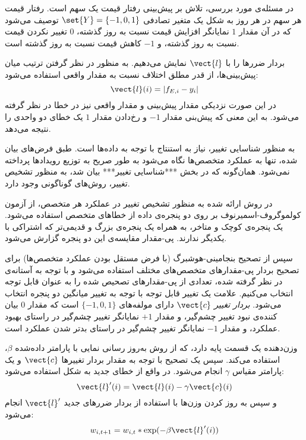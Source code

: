 \documentclass[a4paper,11px]{article}
\begin{document}

در مسئله‌ی مورد بررسی، تلاش بر پیش‌بینی رفتار قیمت یک سهم است. رفتار قیمت هر سهم در هر روز به شکل یک متغیر تصادفی 
$\set{Y} = \{ -1, 0, 1 \}$ 
توصیف می‌شود که در آن مقدار 
$1$ 
نمایانگر افزایش قیمت نسبت به روز گذشته، 
$0$ 
تغییر نکردن قیمت نسبت به روز گذشته، و 
$-1$ 
کاهش قیمت نسبت به روز گذشته است.

بردار ضررها را با 
$\vect{l}$ 
نمایش می‌دهیم. به منظور در نظر گرفتن ترتیب میان پیش‌بینی‌ها، از قدر مطلق اختلاف نسبت به مقدار واقعی استفاده می‌شود:
\[
\vect{l}(i) = | f_{E,i} - y_i |
\]
در این صورت نزدیکی مقدار پیش‌بینی و مقدار واقعی نیز در خطا در نظر گرفته می‌شود. به این معنی که پیش‌بنی مقدار 
$-1$ 
و رخ‌دادن مقدار 
$1$ 
یک خطای دو واحدی را نتیجه می‌دهد.



به منظور شناسایی تغییر، نیاز به استنتاج با توجه به داده‌ها است. طبق فرض‌های بیان شده، تنها به عملکرد متخصص‌ها نگاه می‌شود به طور صریح به توزیع رویدادها پرداخته نمی‌شود. همان‌گونه که در بخش ***شناسایی تغییر*** بیان شد، به منظور تشخیص تغییر، روش‌های گوناگونی وجود دارد.

در روش ارائه شده به منظور تشخیص تغییر در عملکرد هر متخصص، از آزمون کولموگروف-اسمیرنوف
بر روی دو پنجره‌ی داده از خطاهای متخصص استفاده می‌شود. یک پنجره‌ی کوچک و متاخر، به همراه یک پنجره‌ی بزرگ و قدیمی‌تر که اشتراکی با یکدیگر ندارند. پی-مقدار
مقایسه‌ی این دو پنجره گزارش می‌شود.


سپس از تصحیح بنجامینی-هوشبرگ
(با فرض مستقل بودن عملکرد متخصص‌ها) برای تصحیح بردار پی-مقدارهای متخصص‌های مختلف استفاده می‌شود و با توجه به آستانه‌ی در نظر گرفته شده، تعدادی از پی-مقدارهای تصحیص شده را به عنوان قابل توجه انتخاب می‌کنیم. علامت یک تغییر قابل توجه با توجه به تغییر میانگین دو پنجره انتخاب می‌شود.
\textit{
بردار تغییر
} 
$\vect{c}$ 
دارای مولفه‌های 
$\{ -1, 0, 1 \}$ 
است که مقدار 
$0$ 
بیان کننده‌ی نبود تغییر چشم‌گیر، و مقدار 
$+1$ 
نمایانگر تغییر چشم‌گیر در راستای بهبود عملکرد، و مقدار 
$-1$ 
نمایانگر تغییر چشم‌گیر در راستای بدتر شدن عملکرد است.




وزن‌دهنده یک قسمت پایه دارد، که از روش به‌روز رسانی نمایی با پارامتر داده‌شده 
$\beta$، 
استفاده می‌کند. سپس یک تصحیح با توجه به مقدار بردار تغییرها 
$\vect{c}$ 
و یک پارامتر مقیاس 
$\gamma$ 
انجام می‌شود. در واقع از خطای جدید به شکل استفاده می‌شود:
\[
\vect{l}^{\prime}(i) = \vect{l}(i) - \gamma \vect{c}(i)
\]
و سپس به روز کردن وزن‌ها با استفاده از بردار ضررهای جدید 
$\vect{l}^\prime$ 
انجام می‌شود:
\[
w_{i,t+1} = w_{i,t} * \exp( -\beta \vect{l}^{\prime}(i) )
\]
\end{document}
